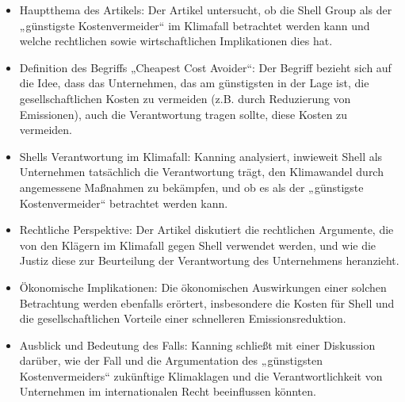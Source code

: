 \documentclass[a4paper, 12pt]{article} %
\begin{document}
\begin{itemize}
   \item Hauptthema des Artikels: Der Artikel untersucht, ob die Shell Group als der „günstigste Kostenvermeider“ im Klimafall betrachtet werden kann und welche rechtlichen sowie wirtschaftlichen Implikationen dies hat.
   \item Definition des Begriffs „Cheapest Cost Avoider“: Der Begriff bezieht sich auf die Idee, dass das Unternehmen, das am günstigsten in der Lage ist, die gesellschaftlichen Kosten zu vermeiden (z.B. durch Reduzierung von Emissionen), auch die Verantwortung tragen sollte, diese Kosten zu vermeiden.
   \item Shells Verantwortung im Klimafall: Kanning analysiert, inwieweit Shell als Unternehmen tatsächlich die Verantwortung trägt, den Klimawandel durch angemessene Maßnahmen zu bekämpfen, und ob es als der „günstigste Kostenvermeider“ betrachtet werden kann.
   \item Rechtliche Perspektive: Der Artikel diskutiert die rechtlichen Argumente, die von den Klägern im Klimafall gegen Shell verwendet werden, und wie die Justiz diese zur Beurteilung der Verantwortung des Unternehmens heranzieht.
   \item Ökonomische Implikationen: Die ökonomischen Auswirkungen einer solchen Betrachtung werden ebenfalls erörtert, insbesondere die Kosten für Shell und die gesellschaftlichen Vorteile einer schnelleren Emissionsreduktion.
   \item Ausblick und Bedeutung des Falls: Kanning schließt mit einer Diskussion darüber, wie der Fall und die Argumentation des „günstigsten Kostenvermeiders“ zukünftige Klimaklagen und die Verantwortlichkeit von Unternehmen im internationalen Recht beeinflussen könnten.
\end{itemize}

\clearpage

\begingroup
\renewcommand{\bibfont}{\fontsize{13pt}{12pt}\selectfont}  
\sloppy
\nocite{*}
\printbibliography{}
\end{document}
